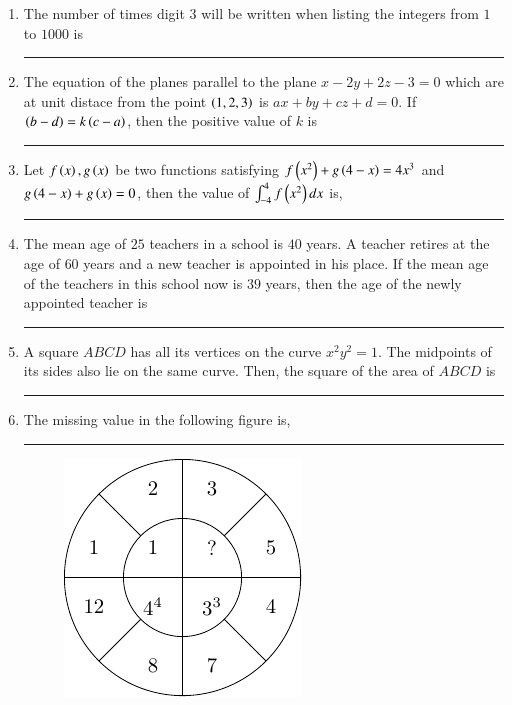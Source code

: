 \documentclass[journal]{IEEEtran}
\begin{document}
\begin{enumerate}
\begin{enumerate}
			\end{enumerate}
	\item The number of times digit $3$ will be written when listing the integers from $1$ to $1000$ is \rule{2cm}{0.1pt}
	\item The equation of the planes parallel to the plane $x-2y+2z-3=0$ which are at unit distace from the point $\left(1,2,3\right)$ is $ax+by+cz+d=0$. If $\left(b-d\right)=k\left(c-a\right)$, then the positive value of $k$ is\rule{2cm}{0.1pt}
	\item Let $f\left(x\right),g\left(x\right)$ be two functions satisfying $f\left(x^2\right)+g\left(4-x\right)=4x^3$ and $g\left(4-x\right)+g\left(x\right)=0$, then the value of $\int_{-4}^4 f\left(x^2\right) dx$ is,\rule{2cm}{0.1pt}
	\item The mean age of $25$ teachers in a school is $40$ years. A teacher retires at the age of $60$ years and a new teacher is appointed in his place. If the mean age of the teachers in this school now is $39$ years, then the age of the newly appointed teacher is\rule{2cm}{0.1pt}
	\item A square $ABCD$ has all its vertices on the curve $x^2y^2 = 1$. The midpoints of its sides also lie on the same curve. Then, the square of the area of $ABCD$ is\rule{2cm}{0.1pt}
	\item The missing value in the following figure is,\rule{2cm}{0.1pt}
		\begin{figure}[H]
			\centering
			\includegraphics[scale=1]{figs26/fig26.png}

\end{figure}
\end{enumerate}
\end{document}
